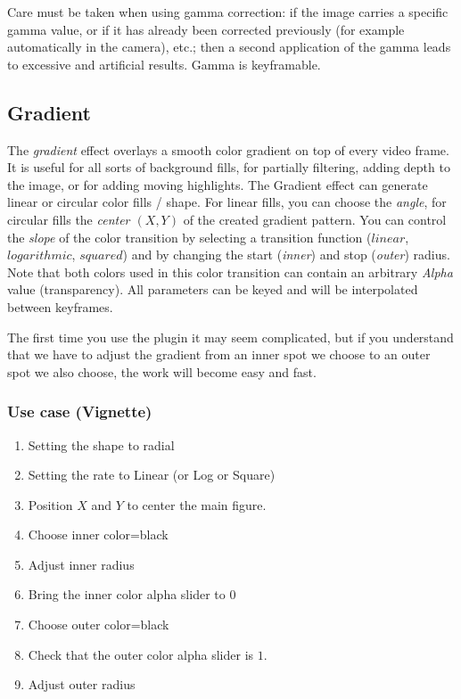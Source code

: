 Care must be taken when using gamma correction: if the image carries a specific gamma value, or if it has already been corrected previously (for example automatically in the camera), etc.; then a second application of the gamma leads to excessive and artificial results. Gamma is keyframable.

\subsection{Gradient}%
\label{sub:gradient}

The \textit{gradient} effect overlays a smooth color gradient on top of every video frame. It is useful for all sorts of background fills, for partially filtering, adding depth to the image, or for adding moving highlights. The Gradient effect can generate linear or circular color fills / shape. For linear fills, you can choose the \textit{angle}, for circular fills the \textit{center $(X,Y)$} of the created gradient pattern. You can control the \textit{slope} of the color transition by selecting a transition function ($linear$, $logarithmic$, $squared$) and by changing the start (\textit{inner}) and stop (\textit{outer}) radius. Note that both colors used in this color transition can contain an arbitrary \textit{Alpha} value (transparency). All parameters can be keyed and will be interpolated between keyframes.

The first time you use the plugin it may seem complicated, but if you understand that we have to adjust the gradient from an inner spot we choose to an outer spot we also choose, the work will become easy and fast.

\subsubsection*{Use case (Vignette)}
\label{ssub:use_case_vignette}

\begin{enumerate}
    \item Setting the shape to radial
    \item Setting the rate to Linear (or Log or Square)
    \item Position $X$ and $Y$ to center the main figure.
    \item Choose inner color=black
    \item Adjust inner radius
    \item Bring the inner color alpha slider to $0$
    \item Choose outer color=black
    \item Check that the outer color alpha slider is $1$.
    \item Adjust outer radius
\end{enumerate}

